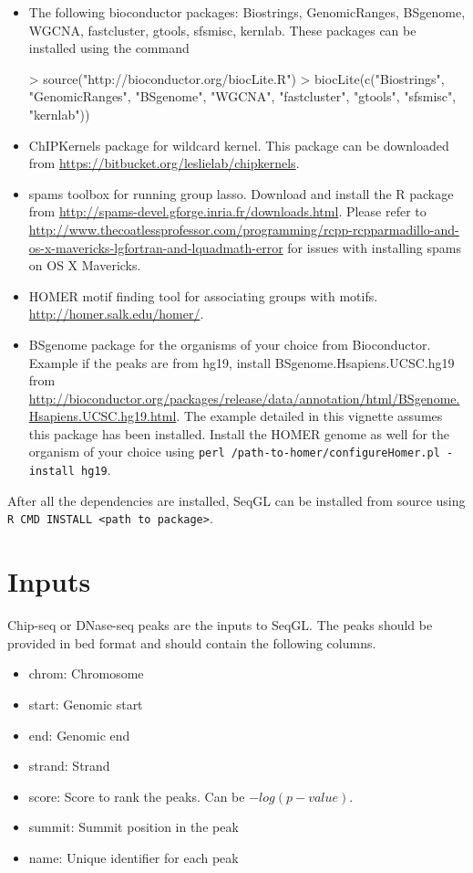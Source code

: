 \documentclass[10pt,oneside]{article}
\begin{document}
\begin{itemize}
\item The following bioconductor packages: Biostrings, GenomicRanges, BSgenome, WGCNA, fastcluster, gtools, sfsmisc, kernlab. 
These packages can be installed using the command 
\begin{Schunk}
\begin{Sinput}
> source("http://bioconductor.org/biocLite.R")
> biocLite(c("Biostrings", "GenomicRanges", "BSgenome", "WGCNA", "fastcluster", "gtools", "sfsmisc", "kernlab"))
\end{Sinput}
\end{Schunk}

\item ChIPKernels package for wildcard kernel. This package can be downloaded from \url{https://bitbucket.org/leslielab/chipkernels}.

\item spams toolbox for running group lasso. Download and install the R package from \url{http://spams-devel.gforge.inria.fr/downloads.html}. Please refer to \url{http://www.thecoatlessprofessor.com/programming/rcpp-rcpparmadillo-and-os-x-mavericks-lgfortran-and-lquadmath-error} for issues with installing spams on OS X Mavericks.

\item HOMER motif finding tool for associating groups with motifs. \url{http://homer.salk.edu/homer/}.

\item BSgenome package for the organisms of your choice from Bioconductor. Example if the peaks are from hg19, install BSgenome.Hsapiens.UCSC.hg19 from \url{http://bioconductor.org/packages/release/data/annotation/html/BSgenome.Hsapiens.UCSC.hg19.html}. The example detailed in this vignette assumes this package has been installed. Install the HOMER genome as well for the organism of your choice using \texttt{perl /path-to-homer/configureHomer.pl -install hg19}.

\end{itemize}

After all the dependencies are installed, SeqGL can be installed from source using \texttt{R CMD INSTALL <path to package>}.

\section{Inputs}
Chip-seq or DNase-seq peaks are the inputs to SeqGL. The peaks should be provided in bed format and should contain the following columns.
\begin{itemize}
\item chrom: Chromosome 
\item start: Genomic start
\item end: Genomic end
\item strand: Strand
\item score: Score to rank the peaks. Can be ${-log (p-value)}$.
\item summit: Summit position in the peak
\item name: Unique identifier for each peak
\end{itemize}
\end{document}
